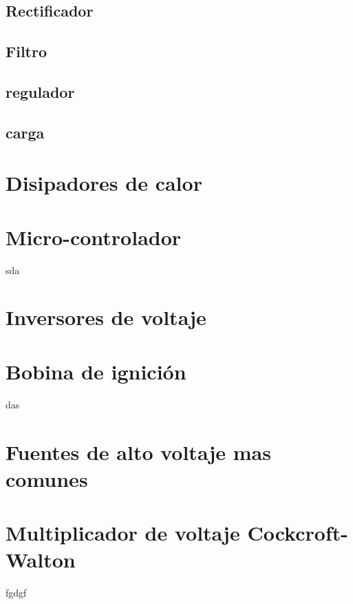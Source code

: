 \subsection{Rectificador}

\subsection{Filtro}
\subsection{regulador}
\subsection{carga}


\newpage
\section{Disipadores de calor}
\section{Micro-controlador}
sda
\section{Inversores de voltaje}
\section{Bobina de ignición}
das
\section{Fuentes de alto voltaje mas comunes}


\section{Multiplicador de voltaje Cockcroft-Walton}
fgdgf